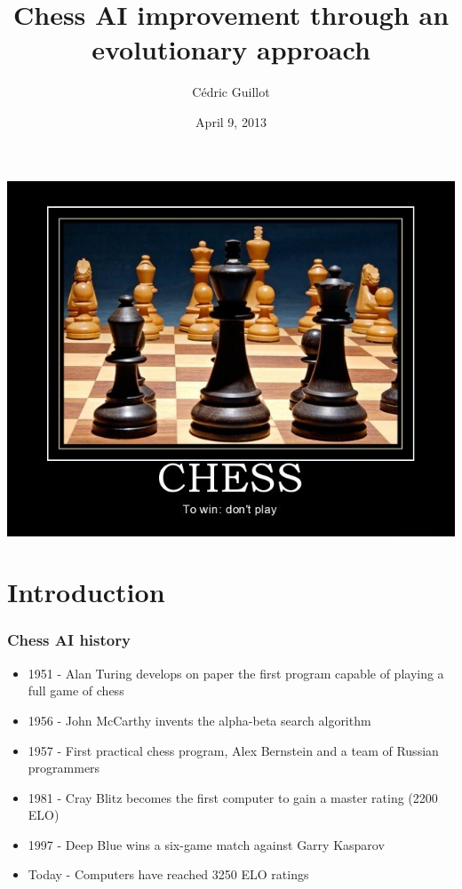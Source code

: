 \documentclass{beamer}
\author{Cédric Guillot}
\institute{CPSC 565}
\title{Chess AI improvement through an evolutionary approach}
\date{April 9, 2013}
\begin{document}
\begin{frame}
\titlepage
\end{frame}

\begin{frame}
\begin{center}
\includegraphics[scale=0.47]{images/to_win_dont_play.jpg}
\end{center}
\end{frame}

\begin{frame}
\tableofcontents
\end{frame}

\section{Introduction}
\begin{frame}
\frametitle{Chess AI history}
\begin{itemize}
\item 1951 - Alan Turing develops on paper the first program capable of playing a full game of chess
\item 1956 - John McCarthy invents the alpha-beta search algorithm
\item 1957 - First practical chess program, Alex Bernstein and a team of Russian programmers
\item 1981 - Cray Blitz becomes the first computer to gain a master rating (2200 ELO)
\item 1997 - Deep Blue wins a six-game match against Garry Kasparov
\item Today - Computers have reached 3250 ELO ratings
\end{itemize}
\end{frame}
\end{document}
